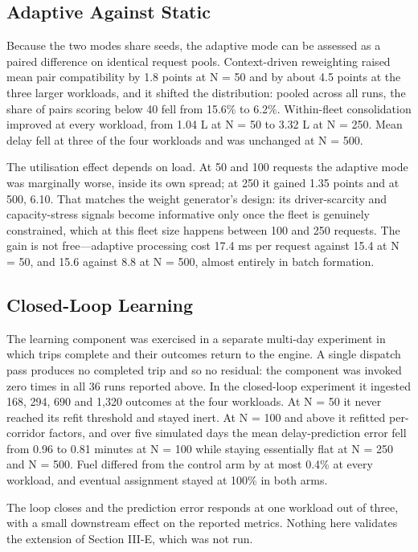 \documentclass[conference]{IEEEtran}
\begin{document}
\subsection{Adaptive Against Static}
Because the two modes share seeds, the adaptive mode can be assessed as a paired difference on identical request pools. Context-driven reweighting raised mean pair compatibility by 1.8 points at N = 50 and by about 4.5 points at the three larger workloads, and it shifted the distribution: pooled across all runs, the share of pairs scoring below 40 fell from 15.6\% to 6.2\%. Within-fleet consolidation improved at every workload, from 1.04 L at N = 50 to 3.32 L at N = 250. Mean delay fell at three of the four workloads and was unchanged at N = 500.

The utilisation effect depends on load. At 50 and 100 requests the adaptive mode was marginally worse, inside its own spread; at 250 it gained 1.35 points and at 500, 6.10. That matches the weight generator's design: its driver-scarcity and capacity-stress signals become informative only once the fleet is genuinely constrained, which at this fleet size happens between 100 and 250 requests. The gain is not free---adaptive processing cost 17.4 ms per request against 15.4 at N = 50, and 15.6 against 8.8 at N = 500, almost entirely in batch formation.

\subsection{Closed-Loop Learning}
The learning component was exercised in a separate multi-day experiment in which trips complete and their outcomes return to the engine. A single dispatch pass produces no completed trip and so no residual: the component was invoked zero times in all 36 runs reported above. In the closed-loop experiment it ingested 168, 294, 690 and 1,320 outcomes at the four workloads. At N = 50 it never reached its refit threshold and stayed inert. At N = 100 and above it refitted per-corridor factors, and over five simulated days the mean delay-prediction error fell from 0.96 to 0.81 minutes at N = 100 while staying essentially flat at N = 250 and N = 500. Fuel differed from the control arm by at most 0.4\% at every workload, and eventual assignment stayed at 100\% in both arms.

The loop closes and the prediction error responds at one workload out of three, with a small downstream effect on the reported metrics. Nothing here validates the extension of Section III-E, which was not run.
\end{document}
